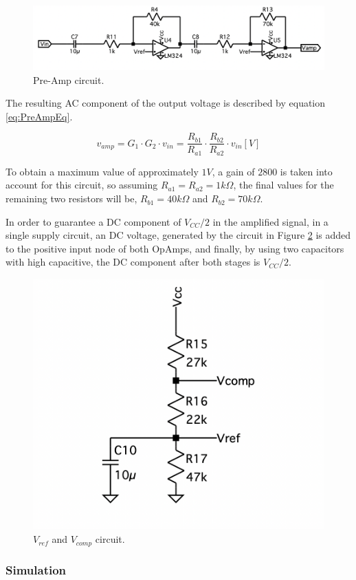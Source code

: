 \begin{figure}[H]
    \centering
    \includegraphics*[scale = 0.5]{Images/PreAmp circuit.png}
    \caption{Pre-Amp circuit.}
    \label{fig:PreAmp}
\end{figure}

The resulting AC component of the output voltage is described by equation \ref{eq:PreAmpEq}.

\begin{equation}
    v_{amp} = G_1 \cdot G_2 \cdot v_{in} = \frac{R_{b1}}{R_{a1}} \cdot \frac{R_{b2}}{R_{a2}} \cdot v_{in} [V]
    \label{eq:PreAmpEq}
\end{equation}

To obtain a maximum value of approximately $1V$, a gain of $2800$ is taken into account for this circuit, so assuming $R_{a1} = R_{a2} = 1k\Omega$, the final values for the remaining two resistors will be, $R_{b1} = 40k\Omega$ and $R_{b2} = 70k\Omega$.

In order to guarantee a DC component of $V_{CC}/2$ in the amplified signal, in a single supply circuit, an DC voltage, generated by the circuit in Figure \ref{fig:VrefVcomp} is added to the positive input node of both OpAmps, and finally, by using two capacitors with high capacitive, the DC component after both stages is $V_{CC}/2$.

\begin{figure}[H]
    \centering
    \includegraphics*[scale = 0.3]{Images/VrefVcomp.png}
    \caption{$V_{ref}$ and $V_{comp}$ circuit.}
    \label{fig:VrefVcomp}
\end{figure}

\subsubsection{Simulation}


